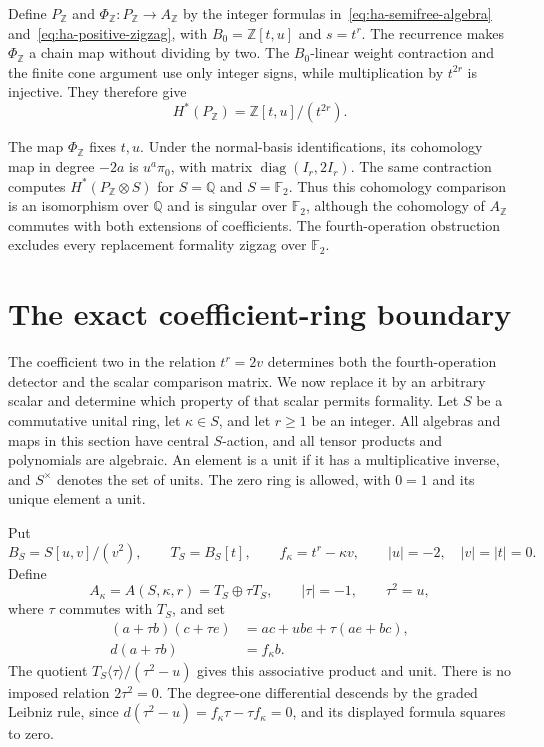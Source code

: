 Define $P_{\mathbb Z}$ and
$\Phi_{\mathbb Z}:P_{\mathbb Z}\to A_{\mathbb Z}$ by the integer
formulas in~\eqref{eq:ha-semifree-algebra} and~\eqref{eq:ha-positive-zigzag},
with $B_0=\mathbb Z[t,u]$ and $s=t^r$.
The recurrence makes $\Phi_{\mathbb Z}$ a chain map without dividing by two.
The $B_0$-linear weight contraction and the finite cone argument use
only integer signs, while multiplication by $t^{2r}$ is injective.
They therefore give
\[
 H^*(P_{\mathbb Z})=\mathbb Z[t,u]/(t^{2r}).
\]

The map $\Phi_{\mathbb Z}$ fixes $t,u$.
Under the normal-basis identifications, its cohomology map in degree
$-2a$ is $u^a\pi_0$, with matrix $\operatorname{diag}(I_r,2I_r)$.
The same contraction computes $H^*(P_{\mathbb Z}\otimes S)$
for $S=\mathbb Q$ and $S=\mathbb F_2$.
Thus this cohomology comparison is an isomorphism over $\mathbb Q$
and is singular over $\mathbb F_2$, although the cohomology of
$A_{\mathbb Z}$ commutes with both extensions of coefficients.
The fourth-operation obstruction excludes every replacement
formality zigzag over $\mathbb F_2$.

\section{The exact coefficient-ring boundary}
\label{sec:ha-ring-formality}

The coefficient two in the relation $t^r=2v$ determines both the
fourth-operation detector and the scalar comparison matrix.
We now replace it by an arbitrary scalar and determine which
property of that scalar permits formality.
Let $S$ be a commutative unital ring, let $\kappa\in S$, and let
$r\geq1$ be an integer.
All algebras and maps in this section have central $S$-action,
and all tensor products and polynomials are algebraic.
An element is a unit if it has a multiplicative inverse, and
$S^\times$ denotes the set of units.
The zero ring is allowed, with $0=1$ and its unique element a unit.

Put
\[
 B_S=S[u,v]/(v^2),\qquad T_S=B_S[t],\qquad f_\kappa=t^r-\kappa v,
 \qquad |u|=-2,\quad |v|=|t|=0.
\]
Define
\[
 A_\kappa=A(S,\kappa,r)=T_S\oplus\tau T_S,
 \qquad |\tau|=-1,\qquad\tau^2=u,
\]
where $\tau$ commutes with $T_S$, and set
\[
 \begin{split}
 (a+\tau b)(c+\tau e)&=ac+ube+\tau(ae+bc),\\
 d(a+\tau b)&=f_\kappa b.
 \end{split}
\]
The quotient $T_S\langle\tau\rangle/(\tau^2-u)$ gives this
associative product and unit.
There is no imposed relation $2\tau^2=0$.
The degree-one differential descends by the graded Leibniz rule,
since $d(\tau^2-u)=f_\kappa\tau-\tau f_\kappa=0$,
and its displayed formula squares to zero.

